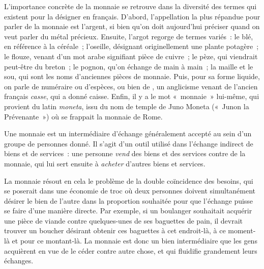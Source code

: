 L'importance concrète de la monnaie se retrouve dans la diversité des termes qui existent pour la désigner en français. D'abord, l'appellation la plus répandue pour parler de la monnaie est l'argent, si bien qu'on doit aujourd'hui préciser quand on veut parler du métal précieux. Ensuite, l'argot regorge de termes variés~: le blé, en référence à la céréale~; l'oseille, désignant originellement une plante potagère~; le flouze, venant d'un mot arabe signifiant pièce de cuivre~; le pèze, qui viendrait peut-être du breton~; le pognon, qu'on échange de main à main~; la maille et le sou, qui sont les noms d'anciennes pièces de monnaie. Puis, pour sa forme liquide, on parle de numéraire ou d'espèces, ou bien de , un anglicisme venant de l'ancien français \emph{casse}, qui a donné caisse. Enfin, il y a le mot «~monnaie~» lui-même, qui provient du latin \emph{moneta}, issu du nom de temple de Juno Moneta («~Junon la Prévenante~») où se frappait la monnaie de Rome.

Une monnaie est un intermédiaire d'échange généralement accepté au sein d'un groupe de personnes donné. Il s'agit d'un outil utilisé dans l'échange indirect de biens et de services~: une personne \emph{vend} des biens et des services contre de la monnaie, qui lui sert ensuite à \emph{acheter} d'autres biens et services.

La monnaie résout en cela le problème de la double coïncidence des besoins, qui se poserait dans une économie de troc où deux personnes doivent simultanément désirer le bien de l'autre dans la proportion souhaitée pour que l'échange puisse se faire d'une manière directe. Par exemple, si un boulanger souhaitait acquérir une pièce de viande contre quelques-unes de ses baguettes de pain, il devrait trouver un boucher désirant obtenir ces baguettes à cet endroit-là, à ce moment-là et pour ce montant-là. La monnaie est donc un bien intermédiaire que les gens acquièrent en vue de le céder contre autre chose, et qui fluidifie grandement leurs échanges.

